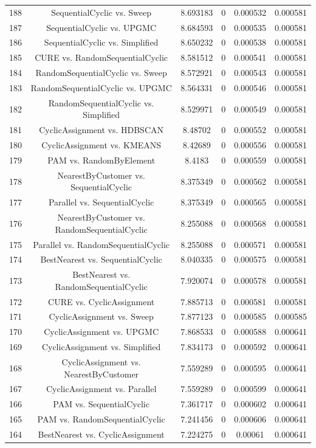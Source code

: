 \documentclass[a4paper,10pt]{article}
\begin{document}
\begin{landscape}
\begin{table}[!htp]
\begin{tabular}{cccccc}
188&SequentialCyclic vs. Sweep&8.693183&0&0.000532&0.000581\\
187&SequentialCyclic vs. UPGMC&8.684593&0&0.000535&0.000581\\
186&SequentialCyclic vs. Simplified&8.650232&0&0.000538&0.000581\\
185&CURE vs. RandomSequentialCyclic&8.581512&0&0.000541&0.000581\\
184&RandomSequentialCyclic vs. Sweep&8.572921&0&0.000543&0.000581\\
183&RandomSequentialCyclic vs. UPGMC&8.564331&0&0.000546&0.000581\\
182&RandomSequentialCyclic vs. Simplified&8.529971&0&0.000549&0.000581\\
181&CyclicAssignment vs. HDBSCAN&8.48702&0&0.000552&0.000581\\
180&CyclicAssignment vs. KMEANS&8.42689&0&0.000556&0.000581\\
179&PAM vs. RandomByElement&8.4183&0&0.000559&0.000581\\
178&NearestByCustomer vs. SequentialCyclic&8.375349&0&0.000562&0.000581\\
177&Parallel vs. SequentialCyclic&8.375349&0&0.000565&0.000581\\
176&NearestByCustomer vs. RandomSequentialCyclic&8.255088&0&0.000568&0.000581\\
175&Parallel vs. RandomSequentialCyclic&8.255088&0&0.000571&0.000581\\
174&BestNearest vs. SequentialCyclic&8.040335&0&0.000575&0.000581\\
173&BestNearest vs. RandomSequentialCyclic&7.920074&0&0.000578&0.000581\\
172&CURE vs. CyclicAssignment&7.885713&0&0.000581&0.000581\\
171&CyclicAssignment vs. Sweep&7.877123&0&0.000585&0.000585\\
170&CyclicAssignment vs. UPGMC&7.868533&0&0.000588&0.000641\\
169&CyclicAssignment vs. Simplified&7.834173&0&0.000592&0.000641\\
168&CyclicAssignment vs. NearestByCustomer&7.559289&0&0.000595&0.000641\\
167&CyclicAssignment vs. Parallel&7.559289&0&0.000599&0.000641\\
166&PAM vs. SequentialCyclic&7.361717&0&0.000602&0.000641\\
165&PAM vs. RandomSequentialCyclic&7.241456&0&0.000606&0.000641\\
164&BestNearest vs. CyclicAssignment&7.224275&0&0.00061&0.000641\\

\end{tabular}
\end{table}
\end{landscape}
\end{document}
